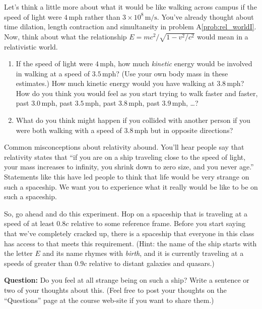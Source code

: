 \begin{exercise}  
  Let's think a little more about what it would be like walking across
  campus if the speed of light were $4\,\text{mph}$ rather than
  $3\times 10^8\,\text{m/s}$.  You've already thought about time
  dilation, length contraction and simultaneity in problem
  A\ref{prob:rel_worldI}.  Now, think about what the relationship $E =
  mc^2/\sqrt{1-v^2/c^2}$ would mean in a relativistic world.
  \begin{enumerate}
  \item If the speed of light were $4\,\text{mph}$, how much \emph{kinetic} energy would be involved in walking at a speed of
    $3.5\,\text{mph}$?  (Use your own body mass in these estimates.)
    How much kinetic energy would you have walking at $3.8\,
    \mbox{mph}$?  How do you think you would feel as you start trying
    to walk faster and faster, past $3.0\,\text{mph}$, past $3.5\,
    \mbox{mph}$, past $3.8\,\text{mph}$, past $3.9\,\text{mph}$,
    \dots ?

  \item What do you think might happen if you collided with another
    person if you were both walking with a speed of $3.8\,\text{mph}$
    but in opposite directions?
  \end{enumerate}
\end{exercise}

\begin{exercise} 
  Common misconceptions about relativity abound.  You'll hear people
  say that relativity states that ``if you are on a ship traveling
  close to the speed of light, your mass increases to infinity, you
  shrink down to zero size, and you never age.''  Statements like this
  have led people to think that life would be very strange on such a
  spaceship.  We want you to experience what it really would be like
  to be on such a spaceship. 

  So, go ahead and do this experiment.  Hop on a spaceship that is
  traveling at a speed of at least $0.8c$ relative to some reference
  frame.  Before you start saying that we've completely cracked up,
  there is a spaceship that everyone in this class has access to that
  meets this requirement.  (Hint: the name of the ship starts with the
  letter $E$ and its name rhymes with \emph{birth}, and it is currently
  traveling at a speeds of greater than $0.9c$ relative to distant
  galaxies and quasars.) 

  \textbf{Question:} Do you feel at all strange being on such a ship?
  Write a sentence or two of your thoughts about this.  (Feel free to
  post your thoughts on the ``Questions'' page at the course web-site
  if you want to share them.)
\end{exercise}


